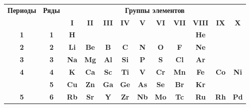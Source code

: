 \documentclass{article}
\begin{document}
\begin{table}[h!]
    \centering
    \renewcommand{\arraystretch}{1.5}
    \begin{tabular}{|c|c|c|c|c|c|c|c|c|c|c|c|}
        \hline
        \multirow{2}{*}{\textbf{Периоды}} & \multirow{2}{*}{\textbf{Ряды}} & \multicolumn{10}{c|}{\textbf{Группы элементов}} \\
        \cline{3-12}
        \textbf{} & & \textbf{I} & \textbf{II} & \textbf{III} & \textbf{IV} & \textbf{V} & \textbf{VI} & \textbf{VII} & \textbf{VIII} & \textbf{IX} & \textbf{X} \\
        \hline
        \textbf{1} & \textbf{1} & \cellcolor{alkali}\textbf{H} & & & & & & & \cellcolor{noble_gas}\textbf{He} & & \\
        \hline
        \textbf{2} & \textbf{2} & \cellcolor{alkali}\textbf{Li} & \cellcolor{alkali}\textbf{Be} & \cellcolor{post_transition}\textbf{B} & \cellcolor{post_transition}\textbf{C} & \cellcolor{post_transition}\textbf{N} & \cellcolor{post_transition}\textbf{O} & \cellcolor{post_transition}\textbf{F} & \cellcolor{post_transition}\textbf{Ne} & & \\
        \hline
        \textbf{3} & \textbf{3} & \cellcolor{alkali}\textbf{Na} & \cellcolor{alkali}\textbf{Mg} & \cellcolor{post_transition}\textbf{Al} & \cellcolor{post_transition}\textbf{Si} & \cellcolor{post_transition}\textbf{P} & \cellcolor{post_transition}\textbf{S} & \cellcolor{post_transition}\textbf{Cl} & \cellcolor{post_transition}\textbf{Ar} & & \\
        \hline
        \multirow{2}{*}{\textbf{4}} & \textbf{4} & \cellcolor{alkali}\textbf{K} & \cellcolor{alkali}\textbf{Ca} & \cellcolor{alkaline_earth}\textbf{Sc} & \cellcolor{alkaline_earth}\textbf{Ti} & \cellcolor{alkaline_earth}\textbf{V} & \cellcolor{alkaline_earth}\textbf{Cr} & \cellcolor{alkaline_earth}\textbf{Mn} & \cellcolor{alkaline_earth}\textbf{Fe} & \cellcolor{alkaline_earth}\textbf{Co} & \cellcolor{alkaline_earth}\textbf{Ni} \\
        \cline{2-12}
        & \textbf{5} & \cellcolor{alkaline_earth}\textbf{Cu} & \cellcolor{alkaline_earth}\textbf{Zn} & \cellcolor{post_transition}\textbf{Ga} & \cellcolor{post_transition}\textbf{Ge} & \cellcolor{post_transition}\textbf{As} & \cellcolor{post_transition}\textbf{Se} & \cellcolor{post_transition}\textbf{Br} & \cellcolor{post_transition}\textbf{Kr} & & \\
        \hline
        \multirow{2}{*}{\textbf{5}} & \textbf{6} & \cellcolor{alkali}\textbf{Rb} & \cellcolor{alkali}\textbf{Sr} & \cellcolor{alkaline_earth}\textbf{Y} & \cellcolor{alkaline_earth}\textbf{Zr} & \cellcolor{alkaline_earth}\textbf{Nb} & \cellcolor{alkaline_earth}\textbf{Mo} & \cellcolor{alkaline_earth}\textbf{Tc} & \cellcolor{alkaline_earth}\textbf{Ru} & \cellcolor{alkaline_earth}\textbf{Rh} & \cellcolor{alkaline_earth}\textbf{Pd} \\

\end{tabular}
\end{table}
\end{document}
